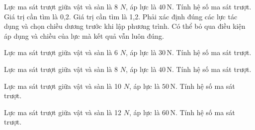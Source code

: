 \begin{ex}
Lực ma sát trượt giữa vật và sàn là 8 $N$, áp lực là $40\,\text{N}$. Tính hệ số ma sát trượt.
\choiceTF
{\True Giá trị cần tìm là 0,2.}
{Giá trị cần tìm là 1,2.}
{\True Phải xác định đúng các lực tác dụng và chọn chiều dương trước khi lập phương trình.}
{Có thể bỏ qua điều kiện áp dụng và chiều của lực mà kết quả vẫn luôn đúng.}
\end{ex}

\begin{ex}
Lực ma sát trượt giữa vật và sàn là 6 $N$, áp lực là $30\,\text{N}$. Tính hệ số ma sát trượt.
\end{ex}

\begin{ex}
Lực ma sát trượt giữa vật và sàn là 8 $N$, áp lực là $40\,\text{N}$. Tính hệ số ma sát trượt.
\end{ex}

\begin{ex}
Lực ma sát trượt giữa vật và sàn là 10 $N$, áp lực là $50\,\text{N}$. Tính hệ số ma sát trượt.
\end{ex}

\begin{ex}
Lực ma sát trượt giữa vật và sàn là 12 $N$, áp lực là $60\,\text{N}$. Tính hệ số ma sát trượt.
\end{ex}

